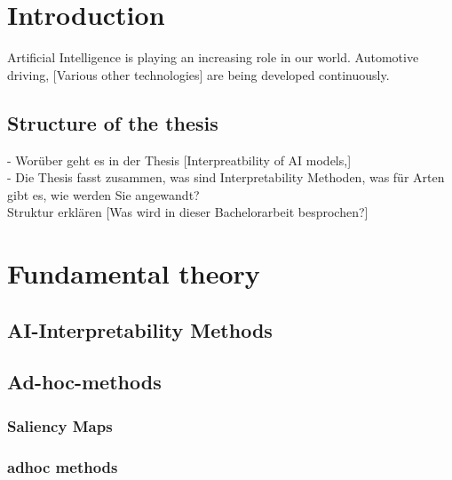 
\chapter{Introduction}

Artificial Intelligence is playing an increasing role in our world. Automotive driving, [Various other technologies] are being developed continuously.\\

\section{Structure of the thesis}

- Worüber geht es in der Thesis [Interpreatbility of AI models,]\\
- Die Thesis fasst zusammen, was sind Interpretability Methoden, was für Arten gibt es, wie werden Sie angewandt?\\
Struktur erklären [Was wird in dieser Bachelorarbeit besprochen?]

\chapter{Fundamental theory}

\section{AI-Interpretability Methods}


\section{Ad-hoc-methods}

\subsection{Saliency Maps}

\subsection{adhoc methods}



